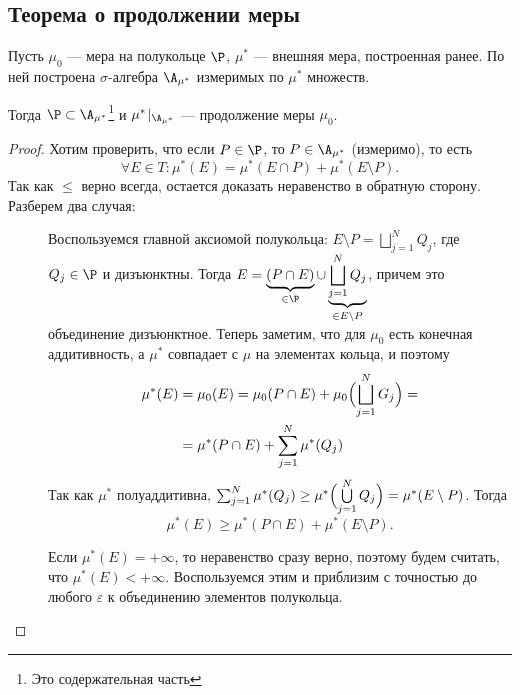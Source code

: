 \subsection{Теорема о продолжении меры}
\begin{thm}
    Пусть $ \mu _0$ --- мера на полукольце $ \P$, $ \mu ^{*}$ --- внешняя мера, построенная ранее. По ней построена  $ \sigma $-алгебра $ \A_{\mu^{*}}$ измеримых по $ \mu ^{*}$ множеств.

	Тогда $ \P \subset \A_{\mu^{*}}$\footnote{Это содержательная часть} и $ \mu ^{*}\!\mid_{\A_{\mu^{*}}}$ --- продолжение меры $ \mu_0$.
\end{thm}
\begin{proof}
	Хотим проверить, что если $ P \in \P$, то  $ P \in \A_{\mu^{*}}$ (измеримо), то есть
	\[
		\forall E \in T\colon \mu ^{*}(E)= \mu ^{*}(E \cap P) + \mu^*( E \setminus P )
	.\] 
	Так как $ \le $ верно всегда, остается доказать неравенство в обратную сторону. 
	Разберем два случая:
	\begin{description}
		\item[] Воспользуемся главной аксиомой полукольца:
			$E \setminus P = \bigsqcup\limits_{j=1}^{N} Q_j$, где $ Q_j \in \P$ и дизъюнктны.
			Тогда $ E = \underbrace{(P \cap  E)}_{ \in \P} \cup \underbrace{\bigsqcup\limits_{j=1}^{N} Q_j}_{ \in E \setminus P}$, причем это объединение дизъюнктное. Теперь заметим, что для $ \mu_0$ есть конечная аддитивность, а $ \mu^*$ совпадает с $ \mu$ на элементах кольца, и поэтому
			\[
			\begin{aligned}
				\mu^*( E )  &= \mu_0(E) = \mu_0(P \cap E) + \mu_0 \Bigl( \bigsqcup\limits_{j=1}^{N} G_j \Bigr) = \\
							&= \mu^*( P \cap E ) + \sum_{j=1}^{N} \mu^*( Q_j ) 
			\end{aligned}
			\]
			Так как $ \mu^*$ полуаддитивна, $ \sum_{j=1}^{N} \mu^*( Q_j )  \ge \mu^*\Bigl( \bigcup\limits_{j=1}^{N} Q_j \Bigr) = \mu^*( E \setminus P )$. Тогда 
			\[
			\mu^*( E  ) \ge  \mu^*( P\cap E ) + \mu^*(E\setminus P) 
			.\] 
		\item[] Если $ \mu^*( E ) = +\infty$, то неравенство сразу верно, поэтому будем считать, что $ \mu^*( E ) < +\infty$. Воспользуемся этим и приблизим с точностью до любого $ \varepsilon $ к объединению элементов полукольца.


\end{description}
\end{proof}
